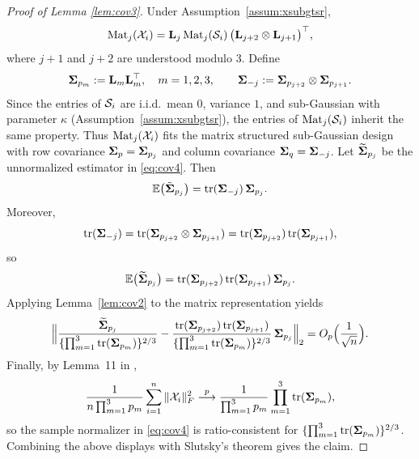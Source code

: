\documentclass[authoryear,preprint,review,12pt]{elsarticle}
\begin{document}
\begin{proof}[Proof of Lemma \ref{lem:cov3}]
	Under Assumption~\ref{assum:xsubgtsr},
	\[
	{\mbox{Mat}}_j(\mathcal{X}_i)
	= \mathbf{L}_j\,{\mbox{Mat}}_j(\mathcal S_i)\,
	\big(\mathbf{L}_{j+2}\otimes \mathbf{L}_{j+1}\big)^\top ,
	\]
	where $j+1$ and $j+2$ are understood modulo $3$. Define
	\[
	\mathbf{ \Sigma}_{p_m}:=\mathbf{L}_m\mathbf{L}_m^\top,\quad m=1,2,3,
	\qquad
	\mathbf{ \Sigma}_{-j}:=\mathbf{ \Sigma}_{p_{j+2}}\otimes\mathbf{ \Sigma}_{p_{j+1}}.
	\]
	Since the entries of $\mathcal S_i$ are i.i.d.\ mean $0$, variance $1$, and sub-Gaussian
	with parameter $\kappa$ (Assumption~\ref{assum:xsubgtsr}), the entries of
	${\mbox{Mat}}_j(\mathcal S_i)$ inherit the same property. Thus ${\mbox{Mat}}_j(\mathcal{X}_i)$ fits the matrix
	structured sub-Gaussian design with row covariance $\mathbf{ \Sigma}_p=\mathbf{ \Sigma}_{p_j}$ and
	column covariance $\mathbf{ \Sigma}_q=\mathbf{ \Sigma}_{-j}$.
	Let $\widetilde{\mathbf{ \Sigma}}_{p_j}$ be the unnormalized estimator in \eqref{eq:cov4}. Then
	\[
	\mathbb{E}\big(\tilde{\mathbf{ \Sigma}}_{p_j}\big)=\mbox{tr}(\mathbf{ \Sigma}_{-j})\,\mathbf{ \Sigma}_{p_j}.
	\]
	Moreover,
	\[
	\mbox{tr}(\mathbf{ \Sigma}_{-j})
	=\mbox{tr}(\mathbf{ \Sigma}_{p_{j+2}}\otimes\mathbf{ \Sigma}_{p_{j+1}})
	=\mbox{tr}(\mathbf{ \Sigma}_{p_{j+2}})\,\mbox{tr}(\mathbf{ \Sigma}_{p_{j+1}}),
	\]
	so
	\[
	\mathbb{E}\big(\widetilde{\mathbf{ \Sigma}}_{p_j}\big)
	=\mbox{tr}(\mathbf{ \Sigma}_{p_{j+2}})\,\mbox{tr}(\mathbf{ \Sigma}_{p_{j+1}})\,\mathbf{ \Sigma}_{p_j}.
	\]
	Applying Lemma~\ref{lem:cov2} to the matrix representation yields
	\[
	\Big\|
	\frac{\widetilde{\mathbf{ \Sigma}}_{p_j}}{ \{\prod_{m=1}^3 \mbox{tr}(\mathbf{ \Sigma}_{p_m}) \}^{2/3}}
	-\frac{\mbox{tr}(\mathbf{ \Sigma}_{p_{j+2}})\,\mbox{tr}(\mathbf{ \Sigma}_{p_{j+1}})}
	{ \{\prod_{m=1}^3 \mbox{tr}(\mathbf{ \Sigma}_{p_m}) \}^{2/3}}\,\mathbf{ \Sigma}_{p_j}
	\Big\|_2
	=O_p \Big(\frac{1}{\sqrt{n}}\Big).
	\]
	Finally, by Lemma~11 in \citet{Ke2025},
	\[
	\frac{1}{n\prod_{m=1}^3 p_m}\sum_{i=1}^n\|\mathcal{X}_i\|_F^2
	\stackrel{p}{\longrightarrow}
	\frac{1}{\prod_{m=1}^3 p_m}\prod_{m=1}^3 \mbox{tr}(\mathbf{ \Sigma}_{p_m}),
	\]
	so the sample normalizer in \eqref{eq:cov4} is ratio-consistent for
	$ \{\prod_{m=1}^3 \mbox{tr}(\mathbf{ \Sigma}_{p_m}) \}^{2/3}$.
	Combining the above displays with Slutsky's theorem gives the claim.
\end{proof} 
\end{document}

